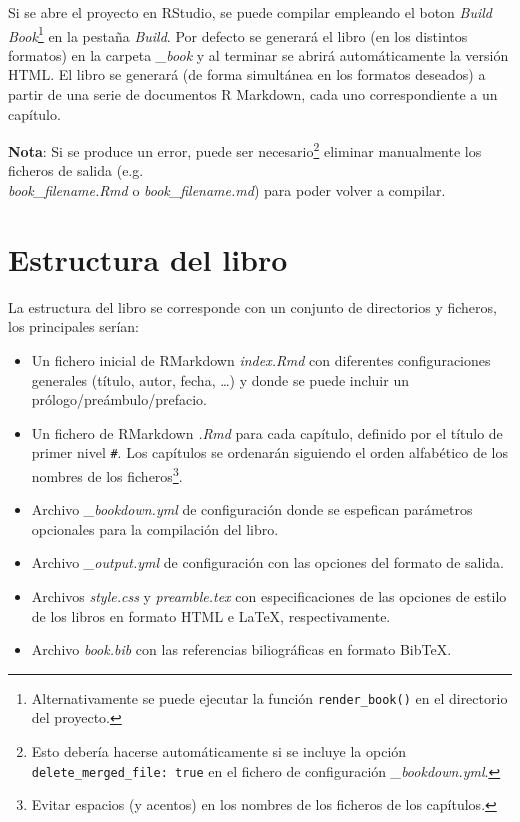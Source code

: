 \documentclass[
]{book}
\theoremstyle{definition}
\theoremstyle{definition}
\theoremstyle{definition}
\theoremstyle{definition}
\theoremstyle{remark}
\begin{document}
Si se abre el proyecto en RStudio, se puede compilar empleando el boton \emph{Build Book}\footnote{Alternativamente se puede ejecutar la función \texttt{render\_book()} en el directorio del proyecto.}
en la pestaña \emph{Build}.
Por defecto se generará el libro (en los distintos formatos)
en la carpeta \emph{\_book} y al terminar se abrirá automáticamente la versión HTML.
El libro se generará (de forma simultánea en los formatos deseados) a partir de una serie de documentos R Markdown, cada uno correspondiente a un capítulo.

\textbf{Nota}: Si se produce un error, puede ser necesario\footnote{Esto debería hacerse automáticamente
  si se incluye la opción \texttt{delete\_merged\_file:\ true} en el fichero de configuración \emph{\_bookdown.yml}.}
eliminar manualmente los ficheros de salida (e.g.\\
\emph{book\_filename.Rmd} o \emph{book\_filename.md}) para poder volver a compilar.

\hypertarget{estructura-del-libro}{%
\section{Estructura del libro}\label{estructura-del-libro}}

La estructura del libro se corresponde con un conjunto de directorios y ficheros, los principales serían:

\begin{itemize}
\item
  Un fichero inicial de RMarkdown \emph{index.Rmd} con diferentes configuraciones generales (título, autor, fecha, \ldots) y donde se puede incluir un prólogo/preámbulo/prefacio.
\item
  Un fichero de RMarkdown \emph{.Rmd} para cada capítulo, definido por el título de primer nivel \texttt{\#}. Los capítulos se ordenarán siguiendo el orden alfabético de los nombres de los ficheros\footnote{Evitar espacios (y acentos) en los nombres de los ficheros de los capítulos.}.
\item
  Archivo \emph{\_bookdown.yml} de configuración donde se espefican parámetros opcionales para la compilación del libro.
\item
  Archivo \emph{\_output.yml} de configuración con las opciones del formato de salida.
\item
  Archivos \emph{style.css} y \emph{preamble.tex} con especificaciones de las opciones de estilo de los libros en formato HTML e LaTeX, respectivamente.
\item
  Archivo \emph{book.bib} con las referencias biliográficas en formato BibTeX.
\end{itemize}
\end{document}
